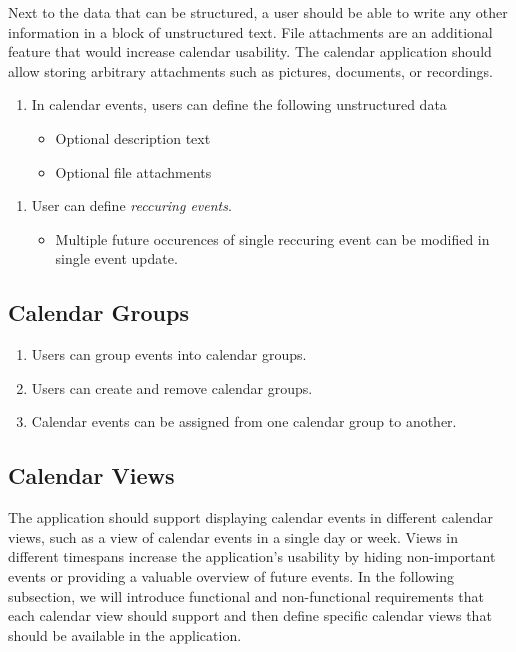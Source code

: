 Next to the data that can be structured, a user should be able to write any other information in a block of unstructured text. File attachments are an additional feature that would increase calendar usability. The calendar application should allow storing arbitrary attachments such as pictures, documents, or recordings.

\begin{enumerate}[label=\color{reqcolor}\textbf{R{\arabic*}}, resume]
    \item \label{app:req:events2} In calendar events, users can define the following unstructured data
        \begin{itemize}
            \item Optional description text
            \item Optional file attachments
        \end{itemize}
\end{enumerate}

\begin{enumerate}[label=\color{reqcolor}\textbf{R{\arabic*}}, resume]
    \item \label{app:req:events3} User can define \textit{reccuring events}.
        \begin{itemize}
            \item Multiple future occurences of single reccuring event can be modified in single event update.
        \end{itemize}
\end{enumerate}

\subsection*{Calendar Groups}

\begin{enumerate}[label=\color{reqcolor}\textbf{R{\arabic*}}, resume]
    \item \label{app:req:groups1} Users can group events into calendar groups.
    \item \label{app:req:groups2} Users can create and remove calendar groups.
    \item \label{app:req:groups3} Calendar events can be assigned from one calendar group to another.
\end{enumerate}

\subsection*{Calendar Views}
The application should support displaying calendar events in different calendar views, such as a view of calendar events in a single day or week. Views in different timespans increase the application's usability by hiding non-important events or providing a valuable overview of future events.
In the following subsection, we will introduce functional and non-functional requirements that each calendar view should support and then define specific calendar views that should be available in the application.

